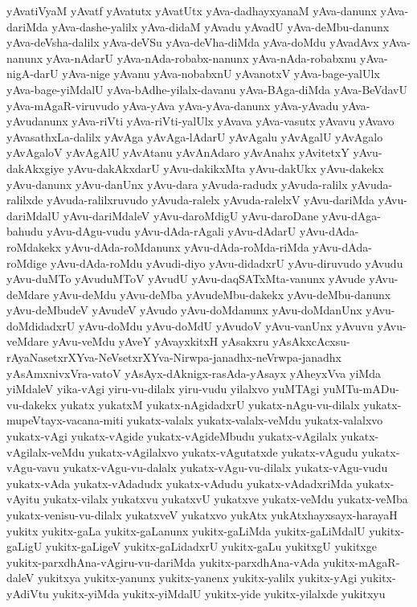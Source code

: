 {yAvatiVyaM
yAvatf
yAvatutx
yAvatUtx
yAva-dadhayxyanaM
yAva-danunx
yAva-dariMda
yAva-dashe-yalilx
yAva-didaM
yAvadu
yAvadU
yAva-deMbu-danunx
yAva-deVsha-dalilx
yAva-deVSu
yAva-deVha-diMda
yAva-doMdu
yAvadAvx
yAva-nanunx
yAva-nAdarU
yAva-nAda-robabx-nanunx
yAva-nAda-robabxnu
yAva-nigA-darU
yAva-nige
yAvanu
yAva-nobabxnU
yAvanotxV
yAva-bage-yalUlx
yAva-bage-yiMdalU
yAva-bAdhe-yilalx-davanu
yAva-BAga-diMda
yAva-BeVdavU
yAva-mAgaR-viruvudo
yAva-yAva
yAva-yAva-danunx
yAva-yAvadu
yAva-yAvudanunx
yAva-riVti
yAva-riVti-yalUlx
yAvava
yAva-vasutx
yAvavu
yAvavo
yAvasathxLa-dalilx
yAvAga
yAvAga-lAdarU
yAvAgalu
yAvAgalU
yAvAgalo
yAvAgaloV
yAvAgAlU
yAvAtanu
yAvAnAdaro
yAvAnahx
yAvitetxY
yAvu-dakAkxgiye
yAvu-dakAkxdarU
yAvu-dakikxMta
yAvu-dakUkx
yAvu-dakekx
yAvu-danunx
yAvu-danUnx
yAvu-dara
yAvuda-radudx
yAvuda-ralilx
yAvuda-ralilxde
yAvuda-ralilxruvudo
yAvuda-ralelx
yAvuda-ralelxV
yAvu-dariMda
yAvu-dariMdalU
yAvu-dariMdaleV
yAvu-daroMdigU
yAvu-daroDane
yAvu-dAga-bahudu
yAvu-dAgu-vudu
yAvu-dAda-rAgali
yAvu-dAdarU
yAvu-dAda-roMdakekx
yAvu-dAda-roMdanunx
yAvu-dAda-roMda-riMda
yAvu-dAda-roMdige
yAvu-dAda-roMdu
yAvudi-diyo
yAvu-didadxrU
yAvu-diruvudo
yAvudu
yAvu-duMTo
yAvuduMToV
yAvudU
yAvu-daqSATxMta-vanunx
yAvude
yAvu-deMdare
yAvu-deMdu
yAvu-deMba
yAvudeMbu-dakekx
yAvu-deMbu-danunx
yAvu-deMbudeV
yAvudeV
yAvudo
yAvu-doMdanunx
yAvu-doMdanUnx
yAvu-doMdidadxrU
yAvu-doMdu
yAvu-doMdU
yAvudoV
yAvu-vanUnx
yAvuvu
yAvu-veMdare
yAvu-veMdu
yAveY
yAvayxkitxH
yAsakxru
yAsAkxcAcxsu-rAyaNasetxrXYva-NeVsetxrXYva-Nirwpa-janadhx-neVrwpa-janadhx
yAsAmxnivxVra-vatoV
yAsAyx-dAknigx-rasAda-yAsayx
yAheyxVva
yiMda
yiMdaleV
yika-vAgi
yiru-vu-dilalx
yiru-vudu
yilalxvo
yuMTAgi
yuMTu-mADu-vu-dakekx
yukatx
yukatxM
yukatx-nAgidadxrU
yukatx-nAgu-vu-dilalx
yukatx-mupeVtayx-vacana-miti
yukatx-valalx
yukatx-valalx-veMdu
yukatx-valalxvo
yukatx-vAgi
yukatx-vAgide
yukatx-vAgideMbudu
yukatx-vAgilalx
yukatx-vAgilalx-veMdu
yukatx-vAgilalxvo
yukatx-vAgutatxde
yukatx-vAgudu
yukatx-vAgu-vavu
yukatx-vAgu-vu-dalalx
yukatx-vAgu-vu-dilalx
yukatx-vAgu-vudu
yukatx-vAda
yukatx-vAdadudx
yukatx-vAdudu
yukatx-vAdadxriMda
yukatx-vAyitu
yukatx-vilalx
yukatxvu
yukatxvU
yukatxve
yukatx-veMdu
yukatx-veMba
yukatx-venisu-vu-dilalx
yukatxveV
yukatxvo
yukAtx
yukAtxhayxsayx-harayaH
yukitx
yukitx-gaLa
yukitx-gaLanunx
yukitx-gaLiMda
yukitx-gaLiMdalU
yukitx-gaLigU
yukitx-gaLigeV
yukitx-gaLidadxrU
yukitx-gaLu
yukitxgU
yukitxge
yukitx-parxdhAna-vAgiru-vu-dariMda
yukitx-parxdhAna-vAda
yukitx-mAgaR-daleV
yukitxya
yukitx-yanunx
yukitx-yanenx
yukitx-yalilx
yukitx-yAgi
yukitx-yAdiVtu
yukitx-yiMda
yukitx-yiMdalU
yukitx-yide
yukitx-yilalxde
yukitxyu
}
